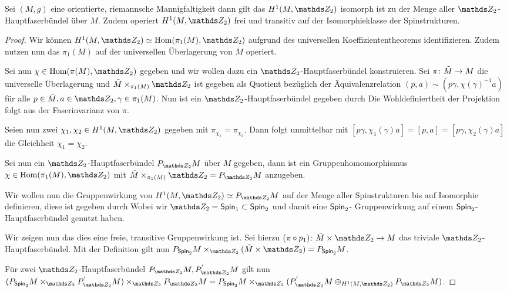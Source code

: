 \begin{Satz}\label{anzahlspin}
	Sei $ (M,g) $ eine orientierte, riemannsche Mannigfaltigkeit dann
	gilt das $ H^1(M,\Z_2) $ isomorph ist zu der Menge aller $ \Z_2 $-Hauptfaserbündel über $ M $. Zudem operiert $ H^1(M,\Z_2) $ frei
	und transitiv auf der Isomorphieklasse der Spinstrukturen.
	\begin{proof}
		Wir können $ H^1(M,\Z_2)\simeq \Hom(\pi_1(M),\Z_2) $ aufgrund des universellen
		Koeffiziententheorems identifizieren. Zudem nutzen nun das $ \pi_1(M) $
		auf der universellen Überlagerung von $ M $ operiert.
		
		Sei nun $ \chi\in\Hom(\pi(M),\Z_2) $ gegeben und wir wollen dazu
		ein $ \Z_2 $-Hauptfaserbündel konstruieren. Sei $ \pi \colon \tilde{M} \rightarrow M $ die universelle Überlagerung
		und $ \tilde{M}\times_{\pi_1(M)}\Z_2 $ ist gegeben als
		Quotient bezüglich der Äquivalenzrelation  $ (p,a) \sim (p\gamma,\chi(\gamma)^{-1}a) $ für alle $ p\in\tilde{M},a\in\Z_2,\gamma\in\pi_1(M) $.
		Nun ist ein $ \Z_2 $-Hauptfaserbündel gegeben durch
		Die Wohldefiniertheit der Projektion folgt aus der Faserinvarianz
		von $ \pi $.
		
		Seien nun zwei $ \chi_1,\chi_2\in H^1(M,\Z_2) $ gegeben mit $ \pi_{\chi_1}=\pi_{\chi_2} $. Dann folgt unmittelbar mit $ [p\gamma,\chi_1(\gamma)a] = [p,a] = [p\gamma,\chi_2(\gamma)a] $
		die Gleichheit $ \chi_1=\chi_2 $.
		
		Sei nun ein $ \Z_2 $-Hauptfaserbündel $ \Ph{\Z_2}{M} $ über $ M $
		gegeben, dann ist ein Gruppenhomomorphismus $ \chi\in\Hom(\pi_1(M),\Z_2) $ mit $ \tilde{M}\times_{\pi_1(M)} \Z_2 = \Ph{\Z_2}{M}$ anzugeben.
		
		Wir wollen nun die Gruppenwirkung von $ H^1(M,\Z_2)\simeq \Ph{\Z_2}{M} $ auf der Menge aller Spinstrukturen bis auf Isomorphie definieren,
		diese ist gegeben durch
		Wobei wir $ \Z_2=\spin_1\subset\spin_2 $ und damit eine $ \operatorname{\mathsf{Spin}}_2 $-
		Gruppenwirkung auf einem $ \operatorname{\mathsf{Spin}}_2 $-Hauptfaserbündel genutzt haben.
		
		Wir zeigen nun das dies eine freie, transitive Gruppenwirkung ist. Sei hierzu $ \abb{(\pi\circ p_1)}{\tilde{M}\times \Z_2}{M} $ das triviale $ \Z_2 $-Hauptfaserbündel. Mit der Definition gilt nun
		$ \Ph{\spin_2}{M} \times_{\Z_2} (\tilde{M} \times \Z_2) = \Ph{\spin_2}{M} $.
		
		Für zwei $ \Z_2 $-Hauptfaserbündel $ \Ph{\Z_2}{M},P^{'}_{\Z_2}M $
		gilt nun $ ( \Ph{\spin_2}{M} \times_{\Z_2} P^{'}_{\Z_2}M ) \times_{\Z_2} \Ph{\Z_2}{M} = \Ph{\spin_2}{M} \times_{\Z_2} (P^{'}_{\Z_2}M \oplus_{H^1(M,\Z_2)} \Ph{\Z_2}{M}) $.
		
		
	\end{proof}
\end{Satz}

